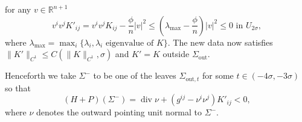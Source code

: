 \documentclass[11pt]{amsart}
\DeclareMathOperator{\dvg}{div} \DeclareMathOperator{\spt}{spt}
\def\R{\mathbb{R}}
\def\d{\delta}
\def\s{\sigma}
\def\l{\lambda}
\def\out{\text{out}}
\begin{document}
for any $v\in \R^{n+1}$
\begin{equation}\label{lK}
 v^iv^jK'_{ij}=v^iv^jK_{ij}-\frac{\phi}{n} |v|^2\le\left(\l_{\max}-\frac{\phi}{n}\right)|v|^2\le0\text{   in   }U_{2\s},
 \end{equation}
where  $\lambda_{\max}=\max_i\{\l_i, \l_i\text{  eigenvalue of  } K\}$. The new data now satisfies $\|K'\|_{C^1}\le C(\|K\|_{C^1},\s)$ and $K'=K$ outside $\Sigma_\out$.


Henceforth we take $\Sigma^-$ to be one of the leaves $\Sigma_{\out, t}$ for some $t\in(-4\s,-3\s)$   so that 
\begin{equation}\label{P-}
(H+P)(\Sigma^-)=\dvg\nu+( g^{ij}-\nu^i\nu^j)K'_{ij}<0,
\end{equation}
where  $\nu$ denotes the outward  pointing unit normal to $\Sigma^-$. 
\end{document}
